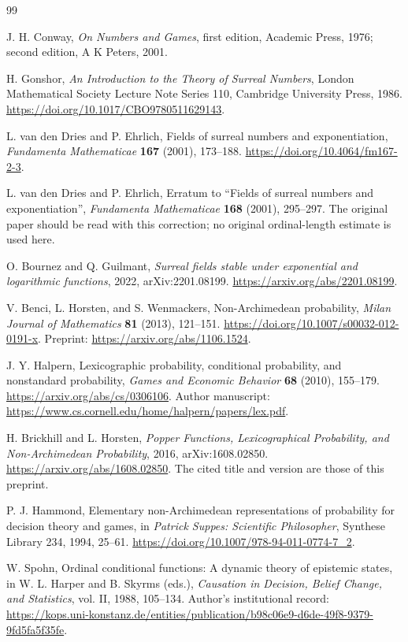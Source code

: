 \documentclass[11pt,a4paper]{article}
\numberwithin{equation}{section}
\theoremstyle{definition}
\theoremstyle{remark}
\begin{document}
\begin{thebibliography}{99}

J. H. Conway, \emph{On Numbers and Games}, first edition, Academic Press,
1976; second edition, A K Peters, 2001.

H. Gonshor, \emph{An Introduction to the Theory of Surreal Numbers},
London Mathematical Society Lecture Note Series 110, Cambridge University
Press, 1986. \url{https://doi.org/10.1017/CBO9780511629143}.

L. van den Dries and P. Ehrlich, Fields of surreal numbers and
exponentiation, \emph{Fundamenta Mathematicae} \textbf{167} (2001),
173--188. \url{https://doi.org/10.4064/fm167-2-3}.

L. van den Dries and P. Ehrlich, Erratum to ``Fields of surreal numbers
and exponentiation'', \emph{Fundamenta Mathematicae} \textbf{168}
(2001), 295--297. The original paper should be read with this correction;
no original ordinal-length estimate is used here.

O. Bournez and Q. Guilmant, \emph{Surreal fields stable under exponential
and logarithmic functions}, 2022, arXiv:2201.08199.
\url{https://arxiv.org/abs/2201.08199}.

V. Benci, L. Horsten, and S. Wenmackers, Non-Archimedean probability,
\emph{Milan Journal of Mathematics} \textbf{81} (2013), 121--151.
\url{https://doi.org/10.1007/s00032-012-0191-x}.
Preprint: \url{https://arxiv.org/abs/1106.1524}.

J. Y. Halpern, Lexicographic probability, conditional probability, and
nonstandard probability, \emph{Games and Economic Behavior}
\textbf{68} (2010), 155--179.
\url{https://arxiv.org/abs/cs/0306106}.
Author manuscript: \url{https://www.cs.cornell.edu/home/halpern/papers/lex.pdf}.

H. Brickhill and L. Horsten, \emph{Popper Functions, Lexicographical
Probability, and Non-Archimedean Probability}, 2016, arXiv:1608.02850.
\url{https://arxiv.org/abs/1608.02850}.
The cited title and version are those of this preprint.

P. J. Hammond, Elementary non-Archimedean representations of probability
for decision theory and games, in \emph{Patrick Suppes: Scientific
Philosopher}, Synthese Library 234, 1994, 25--61.
\url{https://doi.org/10.1007/978-94-011-0774-7_2}.

W. Spohn, Ordinal conditional functions: A dynamic theory of epistemic
states, in W. L. Harper and B. Skyrms (eds.), \emph{Causation in Decision,
Belief Change, and Statistics}, vol. II, 1988, 105--134.
Author's institutional record:
\url{https://kops.uni-konstanz.de/entities/publication/b98c06e9-d6de-49f8-9379-9fd5fa5f35fe}.


\end{thebibliography}
\end{document}
